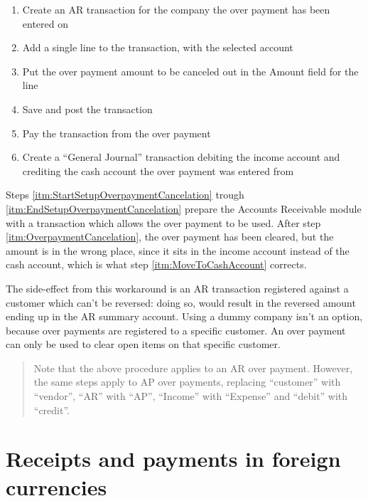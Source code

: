 \begin{enumerate}
\item \label{itm:StartSetupOverpaymentCancelation} Create an AR transaction for the
    company the over payment has been entered on
\item Add a single line to the transaction, with the selected account
\item Put the over payment amount to be canceled out in the Amount field for the line
\item \label{itm:EndSetupOverpaymentCancelation} Save and post the transaction
\item \label{itm:OverpaymentCancelation} Pay the transaction from the over payment
\item \label{itm:MoveToCashAccount} Create a ``General Journal'' transaction debiting the income account and crediting the
    cash account the over payment was entered from
\end{enumerate}

Steps \ref{itm:StartSetupOverpaymentCancelation} trough \ref{itm:EndSetupOverpaymentCancelation}
prepare the Accounts Receivable module with a transaction which allows the over payment to be used.
After step \ref{itm:OverpaymentCancelation}, the over payment has been cleared, but the
amount is in the wrong place, since it sits in the income account instead of the cash account,
which is what step \ref{itm:MoveToCashAccount} corrects.

The side-effect from this workaround is an AR transaction registered against a \gls{customer} which can't
be reversed: doing so, would result in the reversed amount ending up in the AR summary account.  Using
a dummy company isn't an option, because over payments are registered to a specific \gls{customer}.  An
over payment can only be used to clear open items on that specific \gls{customer}.

\begin{quote}
Note that the above procedure applies to an AR over payment. However, the same steps apply to
AP over payments, replacing ``customer'' with ``vendor'', ``AR'' with ``AP'', ``Income'' with
``Expense'' and ``debit'' with ``credit''.
\end{quote}

\section{Receipts and payments in foreign currencies}
\label{sec-business-processes-payment-processing-fx-payments}

